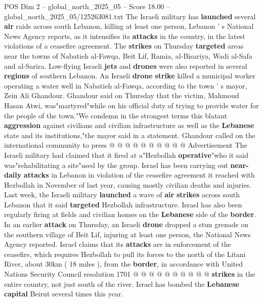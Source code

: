 \begin{textsample}{POS Dim 2 – global\_north\_2025\_05 – Score 18.00 – global\_north\_2025\_05/125263081.txt}  \label{ex:f2_pos_409}
The Israeli military has \textbf{launched} several \textbf{air} raids across south Lebanon, killing at least one person, Lebanon ' s National News Agency reports, as it intensifies its \textbf{attacks} in the country, in the latest violations of a ceasefire agreement.
The \textbf{strikes} on Thursday \textbf{targeted} areas near the towns of Nabatieh al-Fawqa, Beit Lif, Ramia, al-Bisariya, Wadi al-Safa and al-Sarira.
Low-flying Israeli \textbf{jets} and \textbf{drones} were also reported in several \textbf{regions} of southern Lebanon.
An Israeli \textbf{drone} \textbf{strike} killed a municipal worker operating a water well in Nabatieh al-Fawqa, according to the town ' s mayor, Zein Ali Ghandour.
Ghandour said on Thursday that the victim, Mahmoud Hasan Atwi, was"martyred"while on his official duty of trying to provide water for the people of the town."We condemn in the strongest terms this blatant \textbf{aggression} against civilians and civilian infrastructure as well as the \textbf{Lebanese} state and its institutions,"the mayor said in a statement.
Ghandour called on the international community to press @ @ @ @ @ @ @ @ @ @ Advertisement The Israeli military had claimed that it fired at a"Hezbollah \textbf{operative}"who it said was"rehabilitating a site"used by the group.
Israel has been carrying out \textbf{near-daily} \textbf{attacks} in Lebanon in violation of the ceasefire agreement it reached with Hezbollah in November of last year, causing mostly civilian deaths and injuries.
Last week, the Israeli military \textbf{launched} a wave of \textbf{air} \textbf{strikes} across south Lebanon that it said \textbf{targeted} Hezbollah infrastructure.
Israel has also been regularly firing at fields and civilian homes on the \textbf{Lebanese} side of the \textbf{border}.
In an earlier \textbf{attack} on Thursday, an Israeli \textbf{drone} dropped a stun grenade on the southern village of Beit Lif, injuring at least one person, the National News Agency reported.
Israel claims that its \textbf{attacks} are in enforcement of the ceasefire, which requires Hezbollah to pull its forces to the north of the Litani River, about 30km ( 18 miles ), from the \textbf{border}, in accordance with United Nations Security Council resolution 1701 @ @ @ @ @ @ @ @ @ @ \textbf{strikes} in the entire country, not just south of the river.
Israel has bombed the \textbf{Lebanese} \textbf{capital} Beirut several times this year.

\end{textsample}
